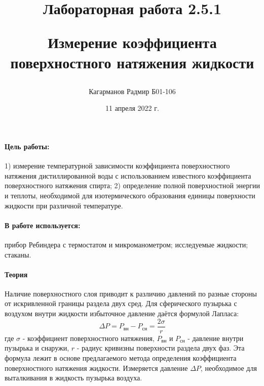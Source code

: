 \documentclass[a4paper,12pt]{article}
\title{Лабораторная работа 2.5.1 

Измерение коэффициента поверхностного натяжения жидкости}
\author{Кагарманов Радмир Б01-106}
\date{11 апреля 2022 г.}
\begin{document}
\maketitle
\newpage
\paragraph{Цель работы:}1) измерение температурной зависимости  коэффициента поверхностного натяжения дистиллированной воды с использованием известного коэффициента поверхностного натяжения спирта;  2) определение полной поверхностной энергии  и теплоты, необходимой для изотермического образования единицы  поверхности жидкости  при различной температуре.
\paragraph{В работе используется:}прибор  Ребиндера  с термостатом и микроманометром; исследуемые жидкости; стаканы.
\paragraph{Теория\\}
Наличие поверхностного слоя приводит к различию давлений по разные стороны от искривленной границы раздела двух сред.  Для сферического пузырька с воздухом  внутри жидкости избыточное давление даётся формулой Лапласа:
\begin{equation}
    \Delta P = P_{\text{вн}} - P_{\text{сн}} = \dfrac{2 \sigma}{r}
\end{equation}
где $\sigma$ - коэффициент поверхностного натяжения, $P_{\text{вн}}$ и $P_{\text{сн}}$ - давление внутри пузырька и снаружи, $r$ - радиус кривизны поверхности раздела двух фаз. Эта формула лежит в основе предлагаемого метода определения коэффициента поверхностного натяжения жидкости. Измеряется давление $\Delta P$, необходимое для выталкивания в жидкость пузырька воздуха.
\end{document}
